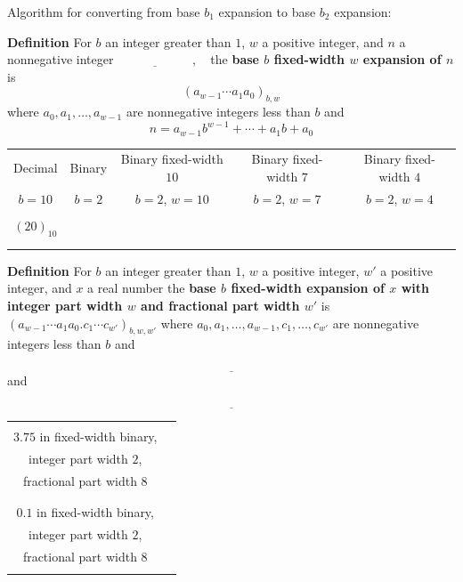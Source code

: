 \documentclass[12pt, oneside]{article}
\begin{document}
\vfill
Algorithm for converting from base $b_1$ expansion to base $b_2$ expansion:

\vfill

{\bf Definition} For $b$ an integer greater than $1$, $w$ a positive integer, and $n$ a nonnegative integer
$\underline{\phantom{\hspace{1in}}}$, ~
the {\bf base $b$ fixed-width $w$ expansion of $n$}  is
\[
(a_{w-1} \cdots a_1 a_0)_{b,w}
\]
where  $a_0, a_1, \ldots, a_{w-1}$ are nonnegative integers less than $b$ and
\[
n =  a_{w-1} b^{w-1} + \cdots + a_1b + a_0
\]


\begin{center}
\begin{tabular}{|c|c|c|c|c|}
\hline
Decimal &  Binary  & Binary fixed-width $10$& Binary fixed-width $7$ & Binary fixed-width $4$\\
$b=10$ & $b=2$ & $b=2$, $w =  10$& $b=2$, $w =  7$& $b=2$, $w =  4$ \\
\hline 
&&&&  \\
$(20)_{10}$&\phantom{$(10100)_{2}$\qquad\qquad}&&  &\\
&&&&  \\
&&&&  \\
\hline
\end{tabular}
\end{center}


\newpage


{\bf Definition} For $b$ an integer greater than $1$, $w$ a positive integer, $w'$ a positive  integer, and $x$ a real number the {\bf base $b$ fixed-width expansion of $x$ with integer part width $w$  and fractional part width $w'$} is
$(a_{w-1} \cdots a_1 a_0 .  c_{1} \cdots c_{w'})_{b,w,w'}$
where  $a_0, a_1, \ldots, a_{w-1}, c_1, \ldots, c_{w'}$ are nonnegative integers less than $b$ and
$$\underline{\phantom{x \geq a_{w-1} b^{w-1} +  \cdots + a_1 b + a_0 +  c_{1} b^{-1} + \cdots +  c_{w'} b^{-w'}}}$$
and
$$\underline{\phantom{x < a_{w-1} b^{w-1} +  \cdots + a_1 b + a_0 +  c_{1} b^{-1} + \cdots +  (c_{w'} +1) b^{-w'}}}$$

\begin{center}
\begin{tabular}{|c|p{5in}|}
\hline
& \\
$3.75$  in fixed-width binary,& \\
integer part width $2$,&\\
 fractional part width $8$ & \\
& \\
\hline
& \\
$0.1$  in fixed-width binary, & \\
integer part width $2$, &\\
 fractional part width $8$ & \\
& \\
\hline
\end{tabular}
\end{center}
\end{document}
